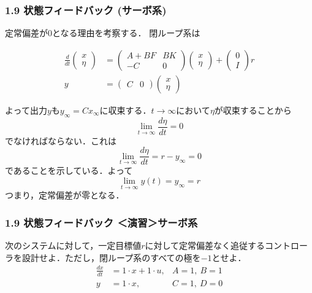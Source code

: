 \begin{frame}[t]
\frametitle{1.9 状態フィードバック (サーボ系)}
定常偏差が$0$となる理由を考察する．
閉ループ系は
\addtocounter{equation}{-2}
\begin{align}
 \frac{d}{dt}
  \left(\begin{array}{c}
         x \\
   \eta
  \end{array}\right)
  &=
  \left(\begin{array}{cc}
         A + B F & B K \\
   - C     & 0
  \end{array}\right)
  \left(\begin{array}{c}
         x \\
   \eta
  \end{array}\right)
  +
  \left(\begin{array}{c}
         0 \\
   I
  \end{array}\right)
  r \\
 y &=
  \left(\begin{array}{cc}
         C & 0
  \end{array}\right)
  \left(\begin{array}{c}
         x \\
   \eta
  \end{array}\right)
\end{align}

よって出力$y$も$y_{\infty} = C x_{\infty}$に収束する．$t
\rightarrow \infty $において$\eta$が収束することから
\begin{equation}
 \lim_{t \rightarrow \infty} \frac{d \eta}{dt} = 0
\end{equation}
でなければならない．これは
\begin{equation}
 \lim_{t \rightarrow \infty} \frac{d \eta}{dt}
  = r - y_{\infty} = 0
\end{equation}
であることを示している．よって
\begin{equation}
   \lim_{t \rightarrow \infty} y(t) = y_\infty= r
\end{equation}
つまり，定常偏差が零となる．
\end{frame}

\begin{frame}[t]
\frametitle{1.9 状態フィードバック ＜演習＞サーボ系}
次のシステムに対して，一定目標値$r$に対して定常偏差なく追従するコントローラを設計せよ．ただし，閉ループ系のすべての極を$-1$とせよ．
\begin{align*}
	\frac{dx}{dt} &= 1 \cdot x + 1 \cdot u, \hspace{0cm} &A=1,\  B=1
\\
	y &= 1 \cdot x , &C=1, \ D=0
\end{align*}
\end{frame}


